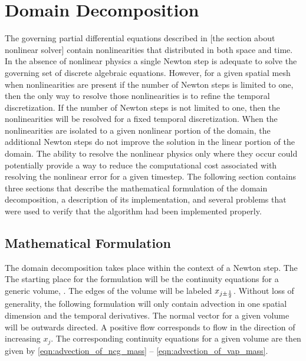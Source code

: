 \chapter{Domain Decomposition}
\label{chap:domain_decomposition}
The governing partial differential equations described in [the section about nonlinear solver] contain nonlinearities that distributed in both space and time.
In the absence of nonlinear physics a single Newton step is adequate to solve the governing set of discrete algebraic equations.
However, for a given spatial mesh when nonlinearities are present if the number of Newton steps is limited to one, then the only way to resolve those nonlinearities is to refine the temporal discretization.
If the number of Newton steps is not limited to one, then the nonlinearities will be resolved for a fixed temporal discretization.
When the nonlinearities are isolated to a given nonlinear portion of the domain, the additional Newton steps do not improve the solution in the linear portion of the domain.
The ability to resolve the nonlinear physics only where they occur could potentially provide a way to reduce the computational cost associated with resolving the nonlinear error for a given timestep.
The following section contains three sections that describe the mathematical formulation of the domain decomposition, a description of its implementation, and several problems that were used to verify that the algorithm had been implemented properly.

\section{Mathematical Formulation}
\label{sec:dd:math}

The domain decomposition takes place within the context of a Newton step.
The 
The starting place for the formulation will be the continuity equations for a generic volume,  .
The edges of the volume will be labeled $x_{j \pm \onehalf}$.
Without loss of generality, the following formulation will only contain advection in one spatial dimension and the temporal derivatives.
The normal vector for a given volume will be outwards directed.
A positive flow corresponds to flow in the direction of increasing $x_{j}$.  
The corresponding continuity equations for a given volume are then given by \eqref{eqn:advection_of_ncg_mass} -- \eqref{eqn:advection_of_vap_mass}.

